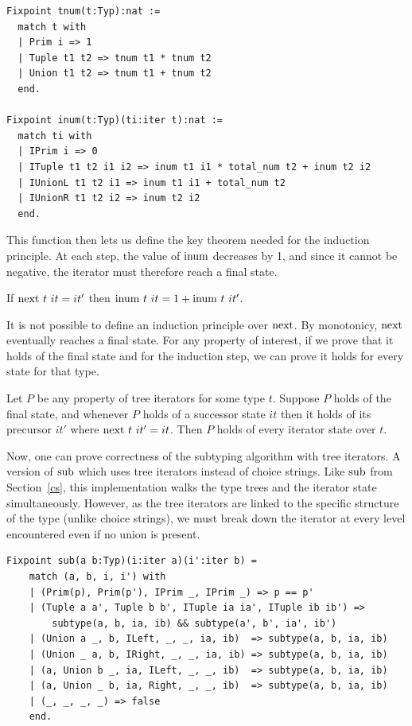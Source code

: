 \documentclass[a4paper,english]{lipics-v2019}
\renewcommand{\c}[1]{\ensuremath{\text{\lstinline{#1}}}\xspace}
\begin{document}
\newpage

\begin{lstlisting}
Fixpoint tnum(t:Typ):nat :=
  match t with
  | Prim i => 1
  | Tuple t1 t2 => tnum t1 * tnum t2
  | Union t1 t2 => tnum t1 + tnum t2
  end.

Fixpoint inum(t:Typ)(ti:iter t):nat :=
  match ti with
  | IPrim i => 0
  | ITuple t1 t2 i1 i2 => inum t1 i1 * total_num t2 + inum t2 i2
  | IUnionL t1 t2 i1 => inum t1 i1 + total_num t2
  | IUnionR t1 t2 i2 => inum t2 i2
  end.
\end{lstlisting}

\noindent This function then lets us define the key theorem needed for the
induction principle. At each step, the value of \c{inum} decreases by 1, and
since it cannot be negative, the iterator must therefore reach a final
state.

\begin{lemma}[Monotonicity]\label{inum_mono}
If $\c{next}~t~it = it'$ then $\c{inum}~t~it = 1 + \c{inum}~t~it'$.
\end{lemma}

\noindent
It is not possible to define an induction principle over \c{next}. By
monotonicy, \c{next} eventually reaches a final state.  For any property
of interest, if we prove that it holds of the final state and for the
induction step, we can prove it holds for every state for that type.

\begin{theorem}\label{indprop}
Let $P$ be any property of tree iterators for some type $t$.  Suppose $P$
holds of the final state, and whenever $P$ holds of a successor state $it$
then it holds of its precursor $it'$ where $\c{next}~t~it' = it$.  Then $P$
holds of every iterator state over $t$.
\end{theorem} 

Now, one can prove correctness of the subtyping algorithm with tree
iterators.  A version of \c{sub} which uses tree iterators instead of choice
strings. Like \c{sub} from Section~\ref{cs}, this implementation walks the
type trees and the iterator state simultaneously. However, as the tree
iterators are linked to the specific structure of the type (unlike choice
strings), we must break down the iterator at every level encountered even if
no union is present.

\begin{lstlisting}
Fixpoint sub(a b:Typ)(i:iter a)(i':iter b) =
    match (a, b, i, i') with
    | (Prim(p), Prim(p'), IPrim _, IPrim _) => p == p'
    | (Tuple a a', Tuple b b', ITuple ia ia', ITuple ib ib') =>
        subtype(a, b, ia, ib) && subtype(a', b', ia', ib')
    | (Union a _, b, ILeft, _, _, ia, ib)  => subtype(a, b, ia, ib)
    | (Union _ a, b, IRight, _, _, ia, ib) => subtype(a, b, ia, ib)
    | (a, Union b _, ia, ILeft, _, _, ib)  => subtype(a, b, ia, ib)
    | (a, Union _ b, ia, Right, _, _, ib)  => subtype(a, b, ia, ib)
    | (_, _, _, _) => false
    end.
\end{lstlisting}
\end{document}
